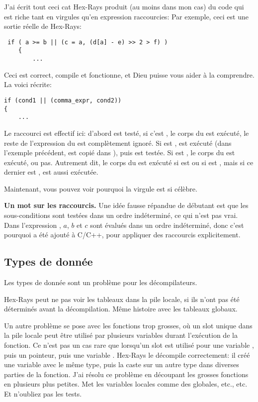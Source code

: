 J'ai écrit tout ceci cat Hex-Rays produit (au moins dans mon cas) du code qui est
riche tant en virgules qu'en expression raccourcies:
Par exemple, ceci est une sortie réelle de Hex-Rays:

\begin{lstlisting}
 if ( a >= b || (c = a, (d[a] - e) >> 2 > f) )
    {
    	...
\end{lstlisting}

Ceci est correct, compile et fonctionne, et Dieu puisse vous aider à la comprendre.
La voici récrite:

\begin{lstlisting}
if (cond1 || (comma_expr, cond2))
{
	...
\end{lstlisting}

Le raccourci est effectif ici: d'abord  est testé, si c'est ,
le corps du  est exécuté, le reste de l'expression du  est complètement
ignoré.
Si  est ,  est exécuté (dans l'exemple précédent,
 est copié dans ), puis  est testée.
Si  est , le corps du  est exécuté, ou pas.
Autrement dit, le corps du  est exécuté si  est  ou si  est ,
mais si ce dernier est ,  est aussi exécutée.

Maintenant, vous pouvez voir pourquoi la virgule est si célèbre.

\textbf{Un mot sur les raccourcis.}
Une idée fausse répandue de débutant est que les sous-conditions sont testées dans
un ordre indéterminé, ce qui n'est pas vrai.
Dans l'expression ,  $a$, $b$ et $c$ sont évalués dans un ordre indéterminé,
donc c'est pourquoi \TT{||} a été ajouté à C/C++, pour appliquer des raccourcis explicitement.

\subsection{Types de donnée}

Les types de donnée sont un problème pour les décompilateurs.

Hex-Rays peut ne pas voir les tableaux dans la pile locale, si ils n'ont pas été déterminés
avant la décompilation. Même histoire avec les tableaux globaux.

Un autre problème se pose avec les fonctions trop grosses, où un slot unique dans
la pile locale peut être utilisé par plusieurs variables durant l'exécution de la
fonction.
Ce n'est pas un cas rare que lorsqu'un slot est utilisé pour une variable ,
puis un pointeur, puis une variable .
Hex-Rays le décompile correctement: il créé une variable avec le même type, puis
la caste sur un autre type dans diverses parties de la fonction.
J'ai résolu ce problème en découpant les grosses fonctions en plusieurs plus petites.
Met les variables locales comme des globales, etc., etc.
Et n'oubliez pas les tests.

